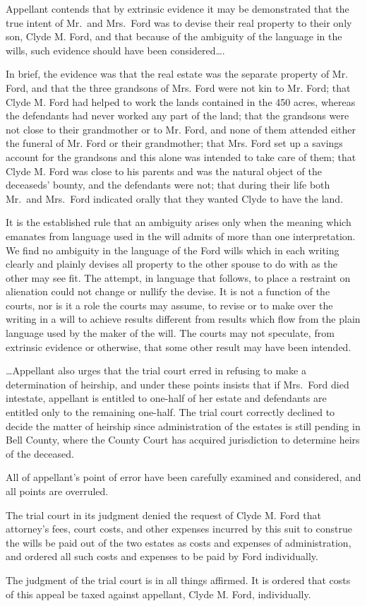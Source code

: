 Appellant contends that by extrinsic evidence it may be demonstrated that the
true intent of Mr.\ and Mrs.\ Ford was to devise their real property to their
only son, Clyde M. Ford, and that because of the ambiguity of the language in
the wills, such evidence should have been considered\dots.

In brief, the evidence was that the real estate was the separate property of Mr.
Ford, and that the three grandsons of Mrs. Ford were not kin to Mr. Ford; that
Clyde M. Ford had helped to work the lands contained in the 450 acres, whereas
the defendants had never worked any part of the land; that the grandsons were
not close to their grandmother or to Mr. Ford, and none of them attended either
the funeral of Mr. Ford or their grandmother; that Mrs. Ford set up a savings
account for the grandsons and this alone was intended to take care of them;
that Clyde M. Ford was close to his parents and was the natural object of the
deceaseds' bounty, and the defendants were not; that during their life both Mr.\
and Mrs.\ Ford indicated orally that they wanted Clyde to have the land.

It is the established rule that an ambiguity arises only when the meaning which
emanates from language used in the will admits of more than one interpretation.
We find no ambiguity in the language of the Ford wills which in each writing
clearly and plainly devises all property to the other spouse to do with as the
other may see fit. The attempt, in language that follows, to place a restraint
on alienation could not change or nullify the devise. It is not a function of
the courts, nor is it a role the courts may assume, to revise or to make over
the writing in a will to achieve results different from results which flow from
the plain language used by the maker of the will. The courts may not speculate,
from extrinsic evidence or otherwise, that some other result may have been
intended.

\dots Appellant also urges that the trial court erred in refusing to make a
determination of heirship, and under these points insists that if Mrs.\ Ford
died intestate, appellant is entitled to one-half of her estate and defendants
are entitled only to the remaining one-half. The trial court correctly declined
to decide the matter of heirship since administration of the estates is still
pending in Bell County, where the County Court has acquired jurisdiction to
determine heirs of the deceased.

All of appellant's point of error have been carefully examined and considered,
and all points are overruled.

The trial court in its judgment denied the request of Clyde M. Ford that
attorney's fees, court costs, and other expenses incurred by this suit to
construe the wills be paid out of the two estates as costs and expenses of
administration, and ordered all such costs and expenses to be paid by Ford
individually.

The judgment of the trial court is in all things affirmed. It is ordered that
costs of this appeal be taxed against appellant, Clyde M. Ford, individually.


